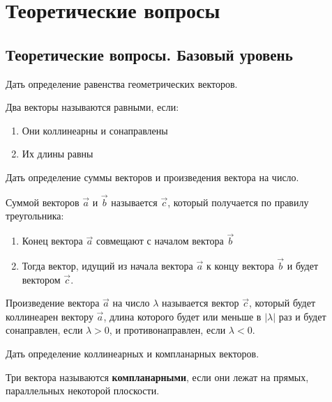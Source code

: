 
\section{Теоретические вопросы}

\subsection{Теоретические вопросы. Базовый уровень}

\begin{question}
  Дать определение равенства геометрических векторов.
\end{question}
\begin{answer}
  Два векторы называются равными, если:
  \begin{enumerate}
    \item Они коллинеарны и сонаправлены
    \item Их длины равны
  \end{enumerate}
\end{answer}

\begin{question}
  Дать определение суммы векторов и произведения вектора на число.
\end{question}
\begin{answer}
  Суммой векторов $\vec{a}$ и $\vec{b}$ называется $\vec{c}$, который получается по правилу треугольника:
  \begin{enumerate}
    \item Конец вектора $\vec{a}$ совмещают с началом вектора $\vec{b}$
    \item Тогда вектор, идущий из начала вектора $\vec{a}$ к концу вектора $\vec{b}$ и будет вектором $\vec{c}$.
  \end{enumerate} 

  Произведение вектора $\vec{a}$ на число $\lambda$ называется вектор $\vec{c}$, который будет коллинеарен вектору $\vec{a}$, длина которого будет или меньше в $|\lambda|$ раз и будет сонаправлен, если $\lambda > 0$, и противонаправлен, если $\lambda < 0$.
\end{answer}

\begin{question}
  Дать определение коллинеарных и компланарных векторов.
\end{question}
\begin{answer}
  Три вектора называются \textbf{компланарными}, если они лежат на прямых, параллельных некоторой плоскости.  
\end{answer}

